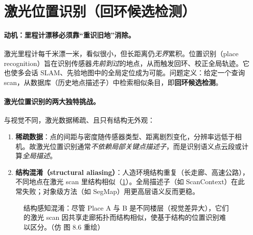 \section{激光位置识别（回环候选检测）}
\label{sec:lidar-place}

\paragraph{动机：里程计漂移必须靠“重识旧地”消除。}
激光里程计每千米漂一米，看似很小，但长距离仍\emph{无界}累积。位置识别（place recognition）旨在识别传感器\emph{先前到过}的地点，从而触发回环、校正全局轨迹\cite{carlone2026handbook}。它也使多会话 SLAM、先验地图中的全局定位成为可能。问题定义：给定一个查询 scan，从数据库（历史地点描述子）中检索相似条目，即\textbf{回环候选检测}。

\paragraph{激光位置识别的两大独特挑战。}
与视觉不同，激光数据稀疏、且只有结构无外观\cite{carlone2026handbook}：
\begin{enumerate}
  \item \textbf{稀疏数据}：点的间距与密度随传感器类型、距离剧烈变化，分辨率远低于相机。故激光位置识别通常\emph{不依赖局部关键点描述子}，而是识别语义点云段或计算\emph{全局描述}。
  \item \textbf{结构混淆（structural aliasing）}：人造环境结构重复（长走廊、高速公路），不同地点在激光 scan 里结构相似（\cref{fig:lidar-aliasing}）。全局描述子（如 ScanContext\cite{kim2018scancontext}）在此常失败；对象级方法（如 SegMap\cite{dube2017segmap}）用更高层语义反而更稳。
\end{enumerate}

\begin{figure}[ht]
\centering
{}
\caption{结构感知混淆：尽管 Place A 与 B 是不同楼层（视觉差异大），它们的激光 scan 因共享走廊拓扑而结构相似，使基于结构的位置识别难以区分。（仿 \cite{carlone2026handbook} 图 8.6 重绘）}
\label{fig:lidar-aliasing}
\end{figure}

